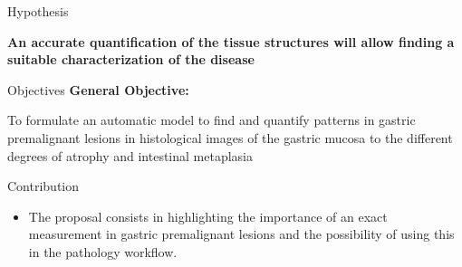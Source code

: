 \documentclass[usenames,dvipsnames]{beamer}
\begin{document}
\begin{frame}{Hypothesis}
\begin{block}{}
\centering\Large \textbf{An accurate quantification of the tissue structures will allow finding a suitable characterization of the disease}
\end{block}
\end{frame}
		
\begin{frame}{Objectives}
\textbf{General Objective:\\} 


 To formulate an automatic model to find and quantify patterns in gastric premalignant lesions in histological images of the gastric mucosa to the different degrees of atrophy and intestinal metaplasia\vspace{20pt}


\end{frame}

\begin{frame}{Contribution}
\begin{itemize}
\item The proposal consists in highlighting the importance of an exact measurement in gastric  premalignant lesions and the possibility of using this in the pathology workflow.
\end{itemize} 

\end{frame}
\end{document}
